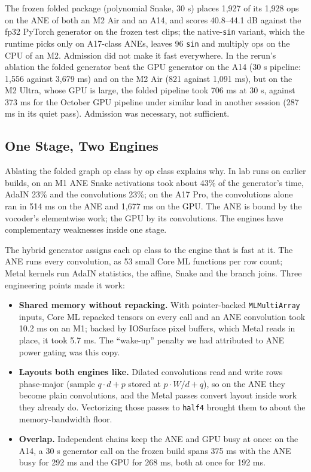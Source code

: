 \documentclass[11pt]{article}
\newcommand{\code}[1]{\texttt{#1}}
\begin{document}
The frozen folded package (polynomial Snake, 30 s) places 1,927 of its 1,928 ops on the ANE of both an M2 Air and an A14, and scores 40.8--44.1 dB against the fp32 PyTorch generator on the frozen test clips; the native-\code{sin} variant, which the runtime picks only on A17-class ANEs, leaves 96 \code{sin} and multiply ops on the CPU of an M2. Admission did not make it fast everywhere. In the rerun's ablation the folded generator beat the GPU generator on the A14 (30 s pipeline: 1,556 against 3,679 ms) and on the M2 Air (821 against 1,091 ms), but on the M2 Ultra, whose GPU is large, the folded pipeline took 706 ms at 30 s, against 373 ms for the October GPU pipeline under similar load in another session (287 ms in its quiet pass). Admission was necessary, not sufficient.

\subsection{One Stage, Two Engines}\label{sec:cs1-hybrid}

Ablating the folded graph op class by op class explains why. In lab runs on earlier builds, on an M1 ANE Snake activations took about 43\% of the generator's time, AdaIN 23\% and the convolutions 23\%; on the A17 Pro, the convolutions alone ran in 514 ms on the ANE and 1,677 ms on the GPU. The ANE is bound by the vocoder's elementwise work; the GPU by its convolutions. The engines have complementary weaknesses inside one stage.

The hybrid generator assigns each op class to the engine that is fast at it. The ANE runs every convolution, as 53 small Core ML functions per row count; Metal kernels run AdaIN statistics, the affine, Snake and the branch joins. Three engineering points made it work:

\begin{itemize}[leftmargin=*]
\item \textbf{Shared memory without repacking.} With pointer-backed \code{MLMultiArray} inputs, Core ML repacked tensors on every call and an ANE convolution took 10.2 ms on an M1; backed by IOSurface pixel buffers, which Metal reads in place, it took 5.7 ms. The ``wake-up'' penalty we had attributed to ANE power gating was this copy.
\item \textbf{Layouts both engines like.} Dilated convolutions read and write rows phase-major (sample $q\cdot d + p$ stored at $p\cdot W/d + q$), so on the ANE they become plain convolutions, and the Metal passes convert layout inside work they already do. Vectorizing those passes to \code{half4} brought them to about the memory-bandwidth floor.
\item \textbf{Overlap.} Independent chains keep the ANE and GPU busy at once: on the A14, a 30 s generator call on the frozen build spans 375 ms with the ANE busy for 292 ms and the GPU for 268 ms, both at once for 192 ms.
\end{itemize}
\end{document}
